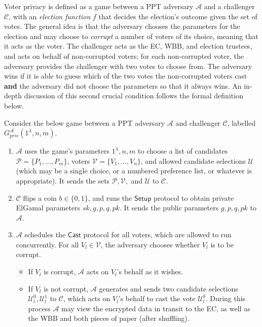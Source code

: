 \documentclass[11pt,twoside,a4paper]{article}
\theoremstyle{definition}
\begin{document}
Voter privacy is defined as a game between a PPT adversary $\mathcal{A}$ and a challenger $\mathcal{C}$, with an \textit{election function} $f$ that decides the election's outcome given the set of votes. The general idea is that the adversary chooses the parameters for the election and may choose to \textit{corrupt} a number of voters of its choice, meaning that it acts as the voter. The challenger acts as the EC, WBB, and election trustees, and acts on behalf of non-corrupted voters; for each non-corrupted voter, the adversary provides the challenger with two votes to choose from. The adversary wins if it is able to guess which of the two votes the non-corrupted voters cast \textbf{and} the adversary did not choose the parameters so that it always wins. An in-depth discussion of this second crucial condition follows the formal definition below.
\begin{definition}
    Consider the below game between a PPT adversary $\mathcal{A}$ and challenger $\mathcal{C}$, labelled $G_{\mathit{priv}}^\mathcal{A}(1^\lambda, n, m)$.
    \begin{enumerate}
        \item $\mathcal{A}$ uses the game's parameters $1^\lambda, n, m$ to choose a list of candidates $\mathcal{P}=\{P_1,\ldots,P_m\}$, voters $\mathcal{V}=\{V_1,\ldots,V_n\}$, and allowed candidate selections $\mathcal{U}$ (which may be a single choice, or a numbered preference list, or whatever is appropriate). It sends the sets $\mathcal{P}, \mathcal{V},$ and $\mathcal{U}$ to $\mathcal{C}$.
        \item $\mathcal{C}$ flips a coin $b\in\{0, 1\}$, and runs the $\mathsf{Setup}$ protocol to obtain private ElGamal parameters $\mathit{sk}, g, p, q, \mathit{pk}$. It sends the public parameters $g, p, q, \mathit{pk}$ to $\mathcal{A}$.
        \item $\mathcal{A}$ schedules the $\mathsf{Cast}$ protocol for all voters, which are allowed to run concurrently. For all $V_l\in\mathcal{V}$, the adversary chooses whether $V_l$ is to be corrupt.
        \begin{itemize}
            \item If $V_l$ is corrupt, $\mathcal{A}$ acts on $V_l$'s behalf as it wishes.
            \item If $V_l$ is not corrupt, $\mathcal{A}$ generates and sends two candidate selections $\mathcal{U}_l^0, \mathcal{U}_l^1$ to $\mathcal{C}$, which acts on $V_l$'s behalf to cast the vote $\mathcal{U}_l^b$. During this process $\mathcal{A}$ may view the encrypted data in transit to the EC, as well as the WBB and both pieces of paper (after shuffling).

\end{itemize}
\end{enumerate}
\end{definition}
\end{document}
